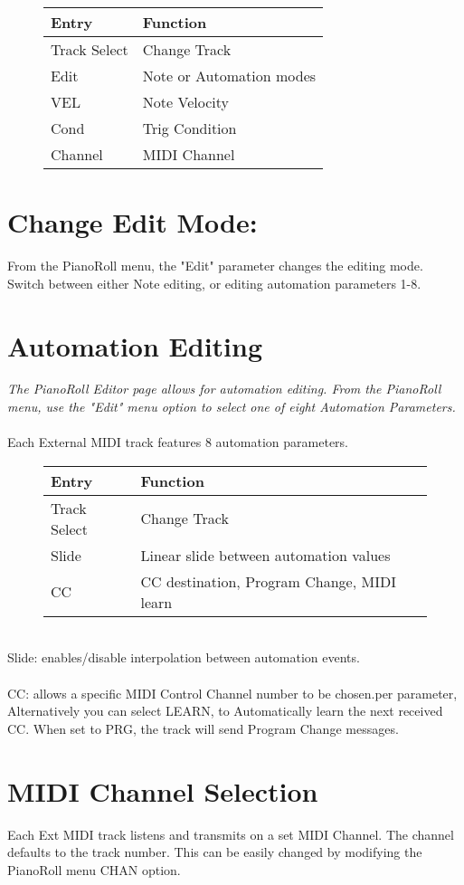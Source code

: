 \begin{figure}[hb]
    \begin{tabular}{|l|l|}
    \hline
    \rowcolor[HTML]{C0C0C0} 
    Entry        & Function \\ \hline
    Track Select & Change Track \\ \hline
    Edit         & Note or Automation modes\\ \hline
    VEL         & Note Velocity\\ \hline
    Cond        & Trig Condition\\ \hline
    Channel     & MIDI Channel\\ \hline
    \end{tabular}
\end{figure}
\section{Change Edit Mode:}
From the PianoRoll menu, the "Edit" parameter changes the editing mode. Switch between either Note editing, or editing automation parameters 1-8.

\newpage
\section{Automation Editing}
\textit{The PianoRoll Editor page allows for automation editing. From the PianoRoll menu, use the "Edit" menu option to select one of eight Automation Parameters.}
\\\\
Each External MIDI track features 8 automation parameters.
\begin{figure}[hb]
    \begin{tabular}{|l|l|}
    \hline
    \rowcolor[HTML]{C0C0C0}
    Entry        & Function \\ \hline
    Track Select & Change Track \\ \hline
    Slide      & Linear slide between automation values \\ \hline
    CC         & CC destination, Program Change,  MIDI learn \\ \hline
    \end{tabular}
\end{figure}
\\
Slide: enables/disable interpolation between automation events.\\\\
CC: allows a specific MIDI Control Channel number to be chosen.per parameter, Alternatively you can select LEARN, to Automatically learn the next received CC. When set to PRG, the track will send Program Change messages.

\section{MIDI Channel Selection}
Each Ext MIDI track listens and transmits on a set MIDI Channel. The channel defaults to the track number. This can be easily changed by modifying the PianoRoll menu CHAN option.\\
